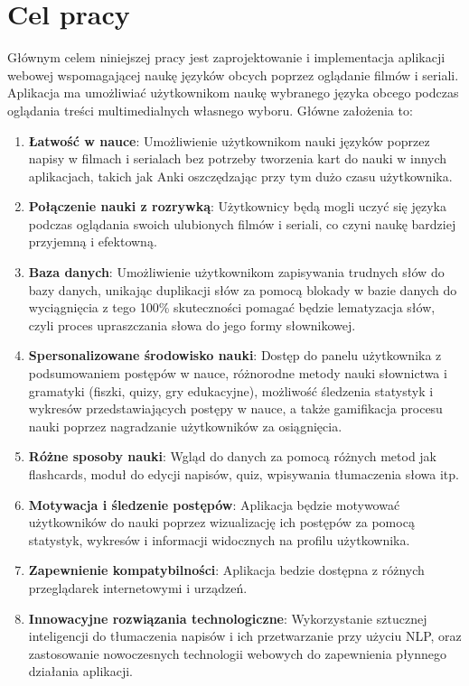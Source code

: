 \section{Cel pracy}
Głównym celem niniejszej pracy jest zaprojektowanie i implementacja aplikacji webowej wspomagającej naukę języków obcych poprzez oglądanie filmów i seriali. Aplikacja ma umożliwiać użytkownikom naukę wybranego języka obcego podczas oglądania treści multimedialnych własnego wyboru. Główne założenia to:

\begin{enumerate}
    \item \textbf{Łatwość w nauce}: Umożliwienie użytkownikom nauki języków poprzez napisy w filmach i serialach
          bez potrzeby tworzenia kart do nauki w innych aplikacjach,
          takich jak Anki oszczędzając przy tym dużo czasu użytkownika.
    \item \textbf{Połączenie nauki z rozrywką}: Użytkownicy będą mogli uczyć się języka podczas oglądania swoich ulubionych filmów i seriali,
          co czyni naukę bardziej przyjemną i efektowną.
    \item \textbf{Baza danych}: Umożliwienie użytkownikom zapisywania trudnych słów do bazy danych,
          unikając duplikacji słów za pomocą blokady w bazie danych do wyciągnięcia z tego 100\% skuteczności pomagać będzie lematyzacja słów,
          czyli proces upraszczania słowa do jego formy słownikowej.
    \item \textbf{Spersonalizowane środowisko nauki}: Dostęp do panelu użytkownika z podsumowaniem postępów w nauce,
          różnorodne metody nauki słownictwa i gramatyki (fiszki, quizy, gry edukacyjne),
          możliwość śledzenia statystyk i wykresów przedstawiających postępy w nauce,
          a także gamifikacja procesu nauki poprzez nagradzanie użytkowników za osiągnięcia.
    \item \textbf{Różne sposoby nauki}: Wgląd do danych za pomocą różnych metod jak flashcards, moduł do edycji napisów, quiz, wpisywania tłumaczenia słowa itp.
    \item \textbf{Motywacja i śledzenie postępów}: Aplikacja będzie motywować użytkowników do nauki poprzez wizualizację ich postępów za pomocą statystyk, wykresów i informacji widocznych na profilu użytkownika.
    \item \textbf{Zapewnienie kompatybilności}: Aplikacja bedzie dostępna z różnych przeglądarek internetowymi i urządzeń.
    \item \textbf{Innowacyjne rozwiązania technologiczne}: Wykorzystanie sztucznej inteligencji do tłumaczenia napisów i ich przetwarzanie przy użyciu NLP,
          oraz zastosowanie nowoczesnych technologii webowych do zapewnienia płynnego działania aplikacji.
\end{enumerate}

